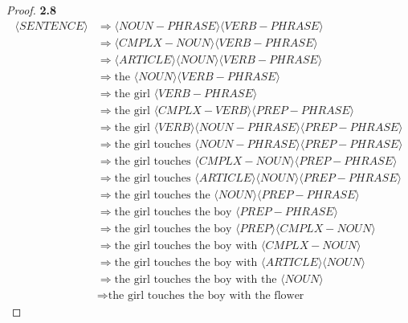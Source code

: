 \documentclass[11pt]{article}
\theoremstyle{definition}
\begin{document}
\begin{proof}{\textbf{2.8}}
\begin{align*}
        \langle SENTENCE \rangle
        &\Rightarrow \langle NOUN-PHRASE \rangle\langle VERB-PHRASE \rangle\\
        &\Rightarrow \langle CMPLX-NOUN \rangle\langle VERB-PHRASE \rangle\\
        &\Rightarrow \langle ARTICLE \rangle\langle NOUN \rangle
        \langle VERB-PHRASE \rangle\\
        &\Rightarrow \text{the }\langle NOUN \rangle\langle VERB-PHRASE \rangle\\
        &\Rightarrow \text{the girl }\langle VERB-PHRASE \rangle\\
        &\Rightarrow \text{the girl }\langle CMPLX-VERB \rangle
        \langle PREP-PHRASE \rangle\\
        &\Rightarrow \text{the girl }\langle VERB \rangle
        \langle NOUN-PHRASE\rangle\langle PREP-PHRASE \rangle\\
        &\Rightarrow \text{the girl touches }\langle NOUN-PHRASE\rangle
        \langle PREP-PHRASE \rangle\\
        &\Rightarrow \text{the girl touches }\langle CMPLX-NOUN\rangle
        \langle PREP-PHRASE \rangle\\
        &\Rightarrow \text{the girl touches }\langle ARTICLE\rangle
        \langle NOUN\rangle\langle PREP-PHRASE \rangle\\
        &\Rightarrow \text{the girl touches the }
        \langle NOUN\rangle\langle PREP-PHRASE \rangle\\
        &\Rightarrow \text{the girl touches the boy }
        \langle PREP-PHRASE \rangle\\
        &\Rightarrow \text{the girl touches the boy }
        \langle PREP\rangle\langle CMPLX-NOUN\rangle\\
        &\Rightarrow \text{the girl touches the boy with }
        \langle CMPLX-NOUN\rangle\\
        &\Rightarrow \text{the girl touches the boy with }
        \langle ARTICLE\rangle\langle NOUN\rangle\\
        &\Rightarrow \text{the girl touches the boy with the }
        \langle NOUN\rangle\\
        &\Rightarrow \text{the girl touches the boy with the flower}
    \end{align*}
\end{proof}
\cleardoublepage
\end{document}
